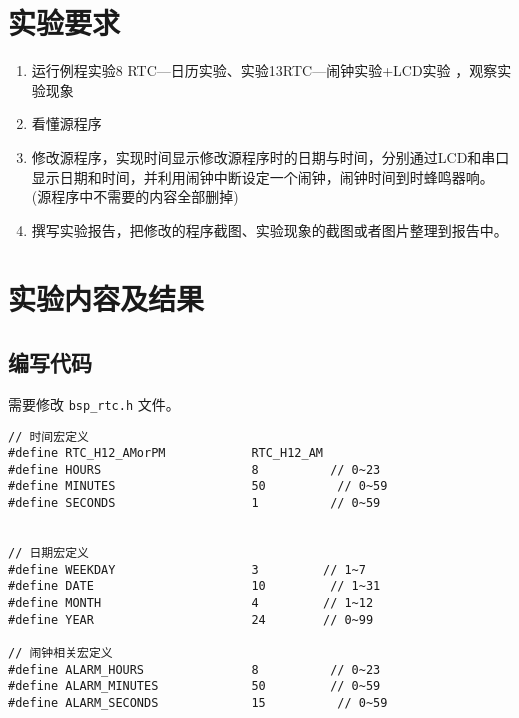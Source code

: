 \documentclass{course-thesis/theme-2639013}
\begin{document}

\makecover


\section{实验要求}

\begin{enumerate}
  \item 运行例程实验8 RTC—日历实验、实验13RTC—闹钟实验+LCD实验 ，观察实验现象
  \item 看懂源程序
  \item 修改源程序，实现时间显示修改源程序时的日期与时间，分别通过LCD和串口显示日期和时间，并利用闹钟中断设定一个闹钟，闹钟时间到时蜂鸣器响。 (源程序中不需要的内容全部删掉)
  \item 撰写实验报告，把修改的程序截图、实验现象的截图或者图片整理到报告中。
\end{enumerate}

\section{实验内容及结果}

\subsection{编写代码}

需要修改 \texttt{bsp\_rtc.h} 文件。

\begin{verbatim}
// 时间宏定义
#define RTC_H12_AMorPM            RTC_H12_AM  
#define HOURS                     8          // 0~23
#define MINUTES                   50          // 0~59
#define SECONDS                   1          // 0~59


// 日期宏定义
#define WEEKDAY                   3         // 1~7
#define DATE                      10         // 1~31
#define MONTH                     4         // 1~12
#define YEAR                      24        // 0~99

// 闹钟相关宏定义
#define ALARM_HOURS               8          // 0~23
#define ALARM_MINUTES             50         // 0~59
#define ALARM_SECONDS             15          // 0~59
\end{verbatim}
\end{document}
